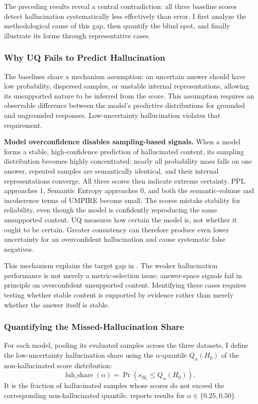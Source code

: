 The preceding results reveal a central contradiction: all three baseline scores detect hallucination systematically less effectively than error. I first analyze the methodological cause of this gap, then quantify the blind spot, and finally illustrate its forms through representative cases.

\subsubsection{Why UQ Fails to Predict Hallucination}

The baselines share a mechanism assumption: an uncertain answer should have low probability, dispersed samples, or unstable internal representations, allowing its unsupported nature to be inferred from the score. This assumption requires an observable difference between the model's predictive distributions for grounded and ungrounded responses. Low-uncertainty hallucination violates that requirement.

\textbf{Model overconfidence disables sampling-based signals.} When a model forms a stable, high-confidence prediction of hallucinated content, its sampling distribution becomes highly concentrated: nearly all probability mass falls on one answer, repeated samples are semantically identical, and their internal representations converge. All three scores then indicate extreme certainty. PPL approaches 1, Semantic Entropy approaches 0, and both the semantic-volume and incoherence terms of UMPIRE become small. The scores mistake stability for reliability, even though the model is confidently reproducing the same unsupported content. UQ measures how certain the model is, not whether it ought to be certain. Greater consistency can therefore produce even lower uncertainty for an overconfident hallucination and cause systematic false negatives.

This mechanism explains the target gap in . The weaker hallucination performance is not merely a metric-selection issue; answer-space signals fail in principle on overconfident unsupported content. Identifying these cases requires testing whether stable content is supported by evidence rather than merely whether the answer itself is stable.

\subsubsection{Quantifying the Missed-Hallucination Share}

For each model, pooling its evaluated samples across the three datasets, I define the low-uncertainty hallucination share using the $\alpha$-quantile $Q_\alpha(H_0)$ of the non-hallucinated score distribution:
\[
\operatorname{luh\_share}(\alpha)
=\Pr\!\left(s_{H_1}\leq Q_\alpha(H_0)\right).
\]
It is the fraction of hallucinated samples whose scores do not exceed the corresponding non-hallucinated quantile.  reports results for $\alpha\in\{0.25,0.50\}$.

